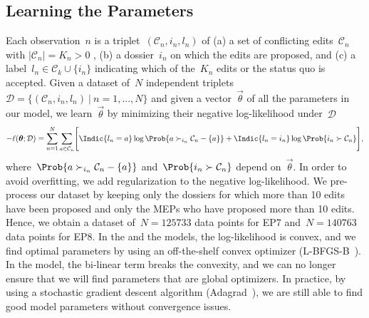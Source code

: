 \subsection{Learning the Parameters}
\label{lmp:sec:training}

Each observation~$n$ is a triplet~$( \mathcal{C}_n, i_n, l_n )$ of (a) a set of conflicting edits~$\mathcal{C}_n$ with $| \mathcal{C}_n | = K_n > 0$ , (b) a dossier~$i_n$ on which the edits are proposed, and (c) a label~$l_n \in \mathcal{C}_k \cup \{ i_n \}$ indicating which of the~$K_n$ edits or the status quo is accepted.
Given a dataset of~$N$ independent triplets \mbox{$\mathcal{D} = \{ ( \mathcal{C}_n, i_n, l_n )~\vert~n = 1, ..., N \}$} and given a vector~$\vec{\theta}$ of all the parameters in our model, we learn~$\vec{\theta}$ by minimizing their negative log-likelihood under~$\mathcal{D}$
\begin{equation*}
	- \ell(\vec{\theta} ; \mathcal{D})
	= \sum_{n = 1}^N  \sum_{a \in \mathcal{C}_n} \Biggl[ \Indic{l_n = a} \log \Prob{a \succ_{i_n} \mathcal{C}_n - \{ a \} }
  + \Indic{l_n = i_n} \log \Prob{i_n \succ \mathcal{C}_n } \Biggr],
\end{equation*}
where~$\Prob{a \succ_{i_n} \mathcal{C}_n - \{ a \} }$ and~$\Prob{i_n \succ \mathcal{C}_n }$ depend on~$\vec{\theta}$.
In order to avoid overfitting, we add regularization to the negative log-likelihood.
We pre-process our dataset by keeping only the dossiers for which more than 10 edits have been proposed and only the MEPs who have proposed more than 10 edits.
Hence, we obtain a dataset of~$N=125733$ data points for EP7 and~$N=140763$ data points for EP8.
In the  and the  models, the log-likelihood is convex, and we find optimal parameters by using an off-the-shelf convex optimizer (L-BFGS-B~\cite{byrd1995limited}).
In the  model, the bi-linear term breaks the convexity, and we can no longer ensure that we will find parameters that are global optimizers.
In practice, by using a stochastic gradient descent algorithm (Adagrad~\cite{duchi2011adaptive}), we are still able to find good model parameters without convergence issues.


